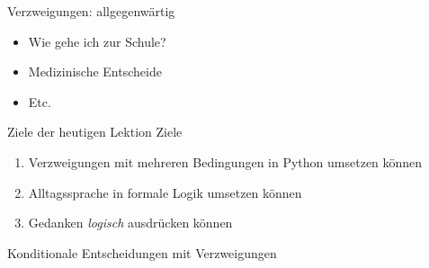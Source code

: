 \begin{frame}[fragile]{Verzweigungen: allgegenwärtig}
    \begin{itemize}
        \item<1-> Wie gehe ich zur Schule?
        \item<3-> Medizinische Entscheide
        \item<5-> Etc.
    \end{itemize}
\end{frame}

\begin{frame}[fragile]{Ziele der heutigen Lektion}
    Ziele
    \begin{enumerate}[<+->]
        \item \faCheckSquare{} Verzweigungen mit mehreren Bedingungen in Python umsetzen können
        \item \faCheckSquare{} Alltagssprache in formale Logik umsetzen können
        \item \faCheckSquare{} Gedanken \textit{logisch} ausdrücken können
    \end{enumerate}
\end{frame}



\begin{frame}[fragile]{Konditionale Entscheidungen mit Verzweigungen}
    
\end{frame}

